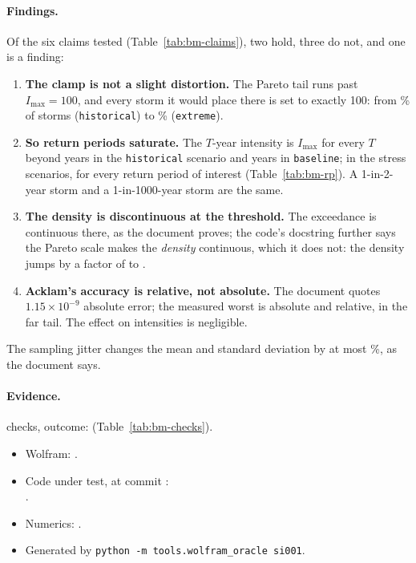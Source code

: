 \documentclass[11pt,a4paper]{article}
\begin{document}
\paragraph{Findings.} Of the six claims tested (Table~\ref{tab:bm-claims}), two hold,
three do not, and one is a finding:
\begin{enumerate}[leftmargin=*]
\item \textbf{The clamp is not a slight distortion.} The Pareto tail runs past
  $I_{\max}=100$, and every storm it would place there is set to exactly 100: from
  \bmMassMaxLow\% of storms (\texttt{historical}) to \bmMassMaxHigh\% (\texttt{extreme}).
\item \textbf{So return periods saturate.} The $T$-year intensity is $I_{\max}$ for
  every $T$ beyond \bmCapHistorical{} years in the \texttt{historical} scenario and
  \bmCapBaseline{} years in \texttt{baseline}; in the stress scenarios, for every
  return period of interest (Table~\ref{tab:bm-rp}). A 1-in-2-year storm and a
  1-in-1000-year storm are the same.
\item \textbf{The density is discontinuous at the threshold.} The exceedance is
  continuous there, as the document proves; the code's docstring further says the
  Pareto scale makes the \emph{density} continuous, which it does not: the density
  jumps by a factor of \bmPdfLow{} to \bmPdfHigh.
\item \textbf{Acklam's accuracy is relative, not absolute.} The document quotes
  $1.15\times10^{-9}$ absolute error; the measured worst is \bmAcklamAbs{} absolute
  and \bmAcklamRel{} relative, in the far tail. The effect on intensities is
  negligible.
\end{enumerate}
The sampling jitter changes the mean and standard deviation by at most \bmJitter\%,
as the document says.

\paragraph{Evidence.} \bmChecks{} checks, outcome: \bmOutcome{}
(Table~\ref{tab:bm-checks}).
\begin{itemize}[leftmargin=*,nosep]
\item Wolfram: \bmWolfram{}\bmWolframVia.
\item Code under test, at commit \bmCodeCommit{}\bmCodeDirty:\\ \bmCodeFiles.
\item Numerics: \bmNumerics.
\item Generated \bmGenerated{} by \texttt{python -m tools.wolfram\_oracle si001}.
\end{itemize}
\end{document}
